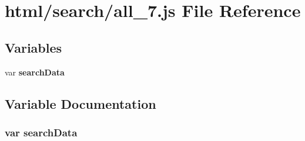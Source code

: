 \section{html/search/all\-\_\-7.js File Reference}
\label{all__7_8js}
\subsection*{Variables}
\begin{DoxyCompactItemize}
\item 
var {\bf search\-Data}
\end{DoxyCompactItemize}


\subsection{Variable Documentation}
\subsubsection[{search\-Data}]{\setlength{\rightskip}{0pt plus 5cm}var search\-Data}\label{all__7_8js_ad01a7523f103d6242ef9b0451861231e}
